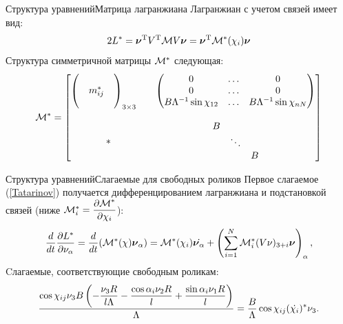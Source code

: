 \documentclass{beamer}
\renewcommand{\vec}[1]{\boldsymbol{\mathbf{#1}}}
\begin{document}
\begin{frame}{Структура уравнений}{Матрица лагранжиана}    
Лагранжиан с учетом связей имеет вид:
$$ 2L^{*}  = \vec{\nu}^\mathrm{T} V^\mathrm{T}\M V\vec{\nu} = \vec{\nu}^\mathrm{T} \M^*(\chi_i)\vec{\nu} $$
Структура симметричной матрицы $\mathcal{M}^*$ следующая:
$$
\mathcal{M}^* = \begin{bmatrix}
        \left(\begin{matrix}&&\\&m^*_{ij}&\\&&\end{matrix}\right)_{3\times3} \quad & \left(\begin{matrix} 0&\ldots& 0 \\ 0&\ldots&0 \\ B\Lambda^{-1}\sin\chi_{12}&\ldots& B\Lambda^{-1}\sin\chi_{nN} \end{matrix}\right) \\[25pt]
        *          & \begin{matrix} B & & \\ & \ddots & \\ & & B \end{matrix} \\
    \end{bmatrix}
$$
\end{frame}

\begin{frame}{Структура уравнений}{Слагаемые для свободных роликов}    
Первое слагаемое (\ref{Tatarinov}) получается дифференцированием лагранжиана и подстановкой связей (ниже $\mathcal{M}^*_i = \displaystyle\frac{\displaystyle \partial \mathcal{M}^*}{\displaystyle \partial \chi_i}$):
\begin{equation*}
    \frac{d}{dt}\frac{\partial L^{*}}{\partial \nu_\alpha} = \frac{d}{dt}(\M^*(\chi)\vec{\nu}_\alpha) = 
    \M^*(\chi_i)\dot{\vec{\nu}_\alpha} +
    \left(\sum_{i=1}^{N}\M^*_i(V\nu)_{3+i}\vec{\nu}\right)_\alpha,
\end{equation*}
Cлагаемые, соответствующие свободным роликам:
\begin{equation*}
    \frac{\cos\chi_{ij} \nu_3 B \left( -\displaystyle\frac{\displaystyle \nu_3 R}{\displaystyle l \Lambda}-\displaystyle\frac{\displaystyle \cos\alpha_i \nu_2 R}{\displaystyle l}+\displaystyle\frac{\displaystyle \sin\alpha_i \nu_1 R}{\displaystyle l}\right) }{\Lambda} = \frac{B}{\Lambda}\cos\chi_{ij}(\dot{\chi_i})^*\nu_3.
\end{equation*}
\end{frame}
\end{document}
